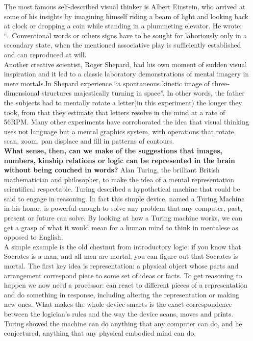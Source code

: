 \documentclass[13pt,letterpaper,onecolumn]{report}
\begin{document}
\hspace{1em}The most famous self-described visual thinker is Albert Einstein, who arrived at some of his insights by imagining himself riding a beam of light and looking back at clock or dropping a coin while standing in a plummeting elevator. He wrote: “...Conventional words or others signs have to be sought for laboriously only in a secondary state, when the mentioned associative play is sufficiently established and can reproduced at will.\\

\hspace{1em}Another creative scientist, Roger Shepard, had his own moment of sudden visual inspiration and it led to a classic laboratory demonstrations of mental imagery in mere mortals.In Shepard experience “a spontaneous kinetic image of three-dimensional structures majestically turning in space”. In other words, the father the subjects had to mentally rotate a letter(in this experiment) the longer they took, from that they estimate that letters resolve in the mind at a rate of 56RPM. Many other experiments have corroborated the idea that visual thinking uses not language but a mental graphics system, with operations that rotate, scan, zoom, pan displace and fill in patterns of contours.\\

\hspace{1em}\textbf{What sense, then, can we make of the suggestions that images, numbers, kinship relations or logic can be represented in the brain without being couched in words?} Alan Turing, the brilliant British mathematician and philosopher, to make the idea of a mental representation scientifical respectable. Turing described a hypothetical machine that could be said to engage in reasoning. In fact this simple device, named a Turing Machine in his honor, is powerful enough to solve any problem that any computer, past, present or future can solve. By looking at how a Turing machine works, we can get a grasp of what it would mean for a human mind to think in mentalese as opposed to English.\\
A simple example is the old chestnut from introductory logic: if you know that Socrates is a man, and all men are mortal, you can figure out that Socrates is mortal. The first key idea is representation: a physical object whose parts and arrangement correspond piece to some set of ideas or facts. To get reasoning to happen we now need a processor: can react to different pieces of a representation and do something in response, including altering the representation or making new ones. What makes the whole device smarts is the exact correspondence between the logician’s rules and the way the device scans, moves and prints.\\Turing showed the machine can do anything that any computer can do, and he conjectured, anything that any physical embodied mind can do.\\
\end{document}
